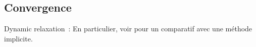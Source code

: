 \subsection{Convergence}

%






Dynamic relaxation~:
\cite{Lewis2003}
En particulier, voir pour un comparatif avec une méthode implicite.


